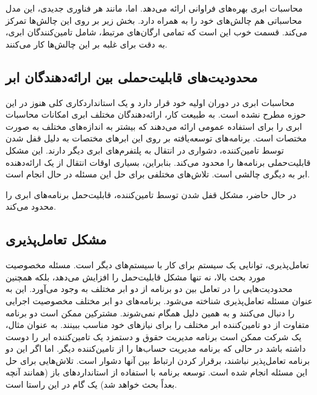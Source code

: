 \documentclass{book}
\begin{document}
        محاسبات ابری بهره‌های فراوانی ارائه می‌دهد. اما، مانند هر فناوری جدیدی، این مدل محاسباتی هم چالش‌های خود را به همراه دارد. بخش زیر بر روی این چالش‌ها تمرکز می‌کند. قسمت خوب این است که تمامی ارگان‌های مرتبط، شامل تامین‌کنندگان ابری، به دقت برای غلبه بر این چالش‌ها کار می‌کنند.
    
    \subsection{محدودیت‌های قابلیت‌حملی بین ارائه‌دهندگان ابر}

        محاسبات ابری در دوران اولیه خود قرار دارد و یک استانداردکاری کلی هنوز در این حوزه مطرح نشده است. به طبیعت کار، ارائه‌دهندگان مختلف ابری امکانات محاسبات ابری را برای استفاده عمومی ارائه می‌دهند که بیشتر به اندازه‌های مختلف به صورت مختصات است. برنامه‌های توسعه‌یافته بر روی این ابرهای مختصات به دلیل قفل شدن توسط تامین‌کننده، دشواری در انتقال به پلتفرم‌های ابری دیگر دارند. این مشکل قابلیت‌حملی برنامه‌ها را محدود می‌کند. بنابراین، بسیاری اوقات انتقال از یک ارائه‌دهنده ابر به دیگری چالشی است. تلاش‌های مختلفی برای حل این مسئله در حال انجام است.

    \begin{addinfo}

        در حال حاضر، مشکل قفل شدن توسط تامین‌کننده، قابلیت‌حمل برنامه‌های ابری را محدود می‌کند.

    \end{addinfo}

    \subsection{مشکل تعامل‌پذیری}

        تعامل‌پذیری، توانایی یک سیستم برای کار با سیستم‌های دیگر است. مسئله مخصوصیت مورد بحث بالا، نه تنها مشکل قابلیت‌حمل را افزایش می‌دهد، بلکه همچنین محدودیت‌هایی را در تعامل بین دو برنامه از دو ابر مختلف به وجود می‌آورد. این به عنوان مسئله تعامل‌پذیری شناخته می‌شود. برنامه‌های دو ابر مختلف مخصوصیت اجرایی را دنبال می‌کنند و به همین دلیل همگام نمی‌شوند. مشترکین ممکن است دو برنامه متفاوت از دو تامین‌کننده ابر مختلف را برای نیازهای خود مناسب ببینند. به عنوان مثال، یک شرکت ممکن است برنامه مدیریت حقوق و دستمزد یک تامین‌کننده ابر را دوست داشته باشد در حالی که برنامه مدیریت حساب‌ها را از تامین‌کننده دیگر. اما اگر این دو برنامه تعامل‌پذیر نباشند، برقرار کردن ارتباط بین آنها دشوار است. تلاش‌هایی برای حل این مسئله انجام شده است. توسعه برنامه با استفاده از استانداردهای باز (همانند آنچه بعداً بحث خواهد شد) یک گام در این راستا است.
\end{document}
